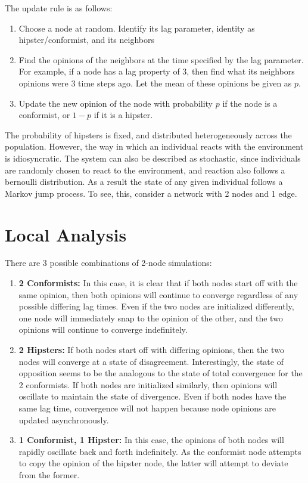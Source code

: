 \documentclass{article}
\begin{document}
The update rule is as follows:
\begin{enumerate}
\item Choose a node at random. Identify its lag parameter, identity as hipster/conformist, and its neighbors
\item Find the opinions of the neighbors at the time specified by the lag parameter. For example, if a node has a lag property of 3, then find what its neighbors opinions were 3 time steps ago. Let the mean of these opinions be given as $p$.
\item Update the new opinion of the node with probability $p$ if the node is a conformist, or $1-p$ if it is a hipster.
\end{enumerate}



The probability of hipsters is fixed, and distributed heterogeneously across the population. However, the way in which an individual reacts with the environment is idiosyncratic. The system can also be described as stochastic, since individuals are randomly chosen to react to the environment, and reaction also follows a bernoulli distribution. As a result the state of any given individual follows a Markov jump process. To see, this, consider a network with 2 nodes and 1 edge.


\section*{Local Analysis}
There are 3 possible combinations of 2-node simulations:
\begin{enumerate}
\item \textbf{2 Conformists:} In this case, it is clear that if both nodes start off with the same opinion, then both opinions will continue to converge regardless of any possible differing lag times. Even if the two nodes are initialized differently, one node will immediately snap to the opinion of the other, and the two opinions will continue to converge indefinitely. 
\item \textbf{2 Hipsters:} If both nodes start off with differing opinions, then the two nodes will converge at a state of disagreement. Interestingly, the state of opposition seems to be the analogous to the state of total convergence for the 2 conformists. If both nodes are initialized similarly, then opinions will oscillate to maintain the state of divergence. Even if both nodes have the same lag time, convergence will not happen because node opinions are updated asynchronously. 
\item \textbf{1 Conformist, 1 Hipster:} In this case, the opinions of both nodes will rapidly oscillate back and forth indefinitely. As the conformist node attempts to copy the opinion of the hipster node, the latter will attempt to deviate from the former.   
\end{enumerate}
\end{document}
